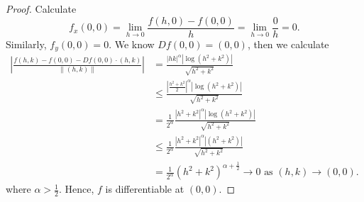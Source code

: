 \begin{Exercise}
\begin{proof}
Calculate
$$
f_x(0,0) 
= \lim_{h\to 0} \frac{f(h,0)-f(0,0)}{h} 
= \lim_{h\to 0} \frac{0}{h}
= 0.
$$
Similarly, $f_y(0,0) = 0$. We know $D f(0,0) = (0,0)$, then we calculate
\begin{align*}
\left| \frac{f(h,k)-f(0,0)-D f(0,0)\cdot(h,k)}{\| (h,k) \|} \right|
&= \frac{|h k|^{\alpha} \left| \log(h^2+k^2) \right|}{\sqrt{h^2+k^2}} \\
&\leq \frac{|\frac{h^2+k^2}{2}|^{\alpha} \left| \log(h^2+k^2) \right|}{\sqrt{h^2+k^2}} \\
&= \frac{1}{2^{\alpha}} \frac{|h^2+k^2|^{\alpha}\left| \log(h^2+k^2) \right|}{\sqrt{h^2+k^2}} \\
&\leq \frac{1}{2^{\alpha}} \frac{|h^2+k^2|^{\alpha}\left| (h^2+k^2) \right|}{\sqrt{h^2+k^2}} \\
&= \frac{1}{2^{\alpha}} (h^2+k^2)^{\alpha+\frac{1}{2}} \to 0 \text{ as } (h,k)\to(0,0).
\end{align*}
where $\alpha>\frac{1}{2}$. Hence, $f$ is differentiable at $(0,0)$. 
\end{proof}
\end{Exercise}